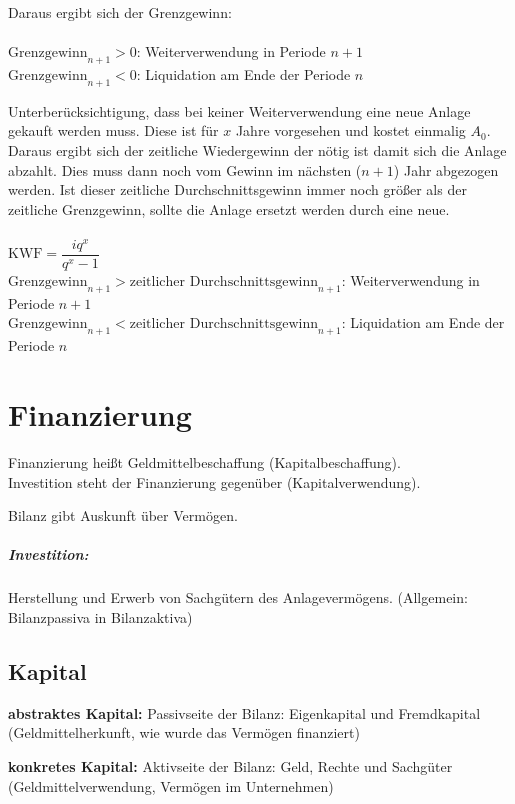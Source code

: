 Daraus ergibt sich der Grenzgewinn:\\
\\
$\text{Grenzgewinn}_{n+1} > 0$: Weiterverwendung in Periode $n+1$\\
$\text{Grenzgewinn}_{n+1} < 0$: Liquidation am Ende der Periode $n$

Unterberücksichtigung, dass bei keiner Weiterverwendung eine neue Anlage gekauft werden muss. Diese ist für $x$ Jahre vorgesehen und kostet einmalig $A_0$. Daraus ergibt sich der zeitliche Wiedergewinn der nötig ist damit sich die Anlage abzahlt.
Dies muss dann noch vom Gewinn im nächsten ($n+1$) Jahr abgezogen werden. Ist dieser zeitliche Durchschnittsgewinn immer noch größer als der zeitliche Grenzgewinn, sollte die Anlage ersetzt werden durch eine neue.\\
\\
$\text{KWF} = \dfrac{iq^x}{q^x-1}$\\
$\text{Grenzgewinn}_{n+1} > \text{zeitlicher Durchschnittsgewinn}_{n+1}$: Weiterverwendung in Periode $n+1$\\
$\text{Grenzgewinn}_{n+1} < \text{zeitlicher Durchschnittsgewinn}_{n+1}$: Liquidation am Ende der Periode $n$

\clearpage
\chapter{Finanzierung}
Finanzierung heißt Geldmittelbeschaffung (Kapitalbeschaffung).\\
Investition steht der Finanzierung gegenüber (Kapitalverwendung).

Bilanz gibt Auskunft über Vermögen.

\paragraph{Investition:} Herstellung und Erwerb von Sachgütern des Anlagevermögens. (Allgemein: Bilanzpassiva in Bilanzaktiva)

\clearpage
\section{Kapital}
\begin{compactitem}
	\item {\bf abstraktes Kapital:} Passivseite der Bilanz: Eigenkapital und Fremdkapital (Geldmittelherkunft, wie wurde das Vermögen finanziert)
	\item {\bf konkretes Kapital:} Aktivseite der Bilanz: Geld, Rechte und Sachgüter (Geldmittelverwendung, Vermögen im Unternehmen)
\end{compactitem}

